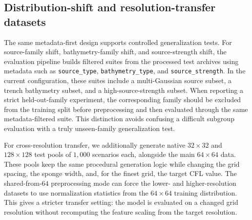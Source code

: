 \subsection{Distribution-shift and resolution-transfer datasets}
\label{subsec:shift-resolution-data}

The same metadata-first design supports controlled generalization tests. For source-family shift, bathymetry-family shift, and source-strength shift, the evaluation pipeline builds filtered suites from the processed test archives using metadata such as \texttt{source\_type}, \texttt{bathymetry\_type}, and \texttt{source\_strength}. In the current configuration, these suites include a multi-Gaussian source subset, a trench bathymetry subset, and a high-source-strength subset. When reporting a strict held-out-family experiment, the corresponding family should be excluded from the training split before preprocessing and then evaluated through the same metadata-filtered suite. This distinction avoids confusing a difficult subgroup evaluation with a truly unseen-family generalization test.

For cross-resolution transfer, we additionally generate native $32\times32$ and $128\times128$ test pools of $1{,}000$ scenarios each, alongside the main $64\times64$ data. These pools keep the same procedural generation logic while changing the grid spacing, the sponge width, and, for the finest grid, the target CFL value. The shared-from-$64$ preprocessing mode can force the lower- and higher-resolution datasets to use normalization statistics from the $64\times64$ training distribution. This gives a stricter transfer setting: the model is evaluated on a changed grid resolution without recomputing the feature scaling from the target resolution.
